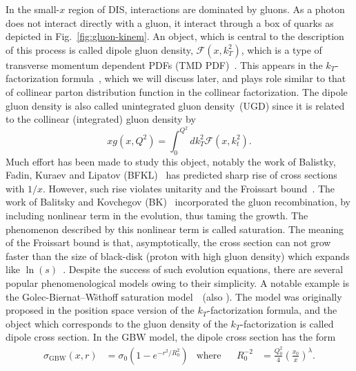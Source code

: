 \documentclass[12pt]{article}
\numberwithin{equation}{section}
\numberwithin{table}{section}
\numberwithin{figure}{section}
\begin{document}
In the small-$x$ region of DIS, interactions are dominated by gluons\cite{Kovchegov:2012mbw}. As a photon does not interact directly with a gluon, it interact through a box of quarks as depicted in Fig.~\ref{fig:gluon-kinem}. 
An object, which is central to the description of this process is called dipole gluon density, $\mathcal{F}(x,k_T^2)$, which is a type of transverse momentum dependent PDFs (TMD PDF)~\cite{Dominguez:2010xd,Dominguez:2011wm,Xiao:2017yya}. This appears in the $k_T$-factorization formula~\cite{Dominguez:2010xd,Dominguez:2011wm,Xiao:2017yya}, which we will discuss later, and plays role similar to that of collinear parton distribution function in the collinear factorization.
The dipole gluon density is also called unintegrated gluon density~(UGD) since it is related to the collinear (integrated) gluon density by
\begin{equation}
xg(x,Q^2)=\int^{Q^2}_0 dk_T^2 \mathcal{F}(x,k^2_t).
\end{equation}
Much effort has been made to study this object, notably the work of Balistky, Fadin, Kuraev and Lipatov (BFKL)~\cite{Balitsky:1978ic, Kuraev:1977fs} has predicted sharp rise of cross sections with $1/x$.  However, such rise violates unitarity and the Froissart bound~\cite{Kovchegov:2012mbw,Barone:1993sy}. The work of Balitsky and Kovchegov (BK)~\cite{Balitsky:1995ub,Kovchegov:1999yj} incorporated the gluon recombination, by including nonlinear term in the evolution, thus taming the growth. The phenomenon described by this nonlinear term is called saturation. The meaning of the Froissart bound is that, asymptotically, the cross section can not grow faster than the size of black-disk (proton with high gluon density) which expands like $\ln(s)$~\cite{Badelek:1992gs}.
Despite the success of such evolution equations, there are several popular phenomenological models owing to their simplicity. A notable example is the Golec-Biernat--W\"sthoff saturation model~\cite{Golec-Biernat:1998zce}~(also \cite{Kowalski:2003hm,McLerran:1993ni,Forshaw:1999uf,Iancu:2003ge}). The model was originally proposed in the position space version of the $k_T$-factorization formula, and the object which corresponds to the gluon density of the $k_T$-factorization is called dipole cross section.
In the GBW model, the dipole cross section has the form~\cite{Golec-Biernat:1998zce}
\begin{align}
\sigma_{\mathrm{GBW}}(x,r)&=\sigma_0\left(1-e^{-r^2/R^2_0}\right)&\mathrm{where}&
&R^{-2}_0&=\frac{Q_0^{2}}{4}\left(\frac{x_0}{x}\right)^\lambda.
\end{align}
\end{document}

